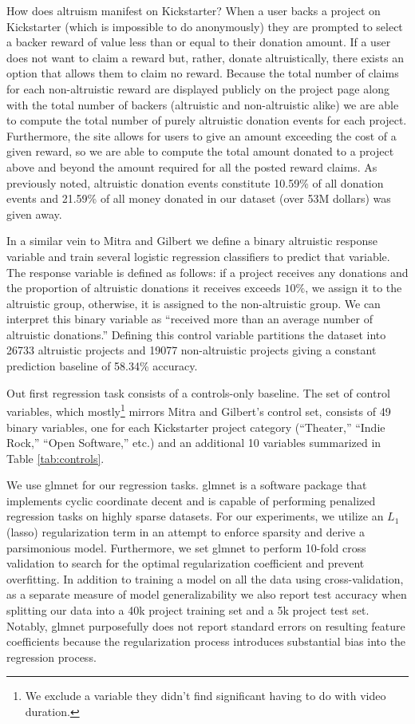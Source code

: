 \documentclass[letterpaper]{article}
\begin{document}
How does altruism manifest on Kickstarter? When a user backs a project on Kickstarter (which is impossible to do anonymously) they are prompted to select a backer reward of value less than or equal to their donation amount. If a user does not want to claim a reward but, rather, donate altruistically, there exists an option that allows them to claim no reward. Because the total number of claims for each non-altruistic reward are displayed publicly on the project page along with the total number of backers (altruistic and non-altruistic alike) we are able to compute the total number of purely altruistic donation events for each project. Furthermore, the site allows for users to give an amount exceeding the cost of a given reward, so we are able to compute the total amount donated to a project above and beyond the amount required for all the posted reward claims. As previously noted, altruistic donation events constitute 10.59\% of all donation events and 21.59\% of all money donated in our dataset (over 53M dollars) was given away.

In a similar vein to Mitra and Gilbert  we define a binary altruistic response variable and train several logistic regression classifiers to predict that variable. The response variable is defined as follows: if a project receives any donations and the proportion of altruistic donations it receives exceeds $10\%$, we assign it to the altruistic group, otherwise, it is assigned to the non-altruistic group. We can interpret this binary variable as ``received more than an average number of altruistic donations.'' Defining this control variable partitions the dataset into 26733 altruistic projects and 19077 non-altruistic projects giving a constant prediction baseline of 58.34\% accuracy.

Out first regression task consists of a controls-only baseline. The set of control variables, which mostly\footnote{We exclude a variable they didn't find significant having to do with video duration.} mirrors Mitra and Gilbert's control set, consists of 49 binary variables, one for each Kickstarter project category (``Theater,'' ``Indie Rock,'' ``Open Software,'' etc.) and an additional 10 variables summarized in Table \ref{tab:controls}.

We use glmnet \cite{friedman2010glmnet} for our regression tasks. glmnet is a software package that implements cyclic coordinate decent and is capable of performing penalized regression tasks on highly sparse datasets. For our experiments, we utilize an $L_1$ (lasso) regularization term in an attempt to enforce sparsity and derive a parsimonious model. Furthermore, we set glmnet to perform 10-fold cross validation to search for the optimal regularization coefficient and prevent overfitting. In addition to training a model on all the data using cross-validation, as a separate measure of model generalizability we also report test accuracy when splitting our data into a 40k project training set and a 5k project test set. Notably, glmnet purposefully does not report standard errors on resulting feature coefficients because the regularization process introduces substantial bias into the regression process.
\end{document}
